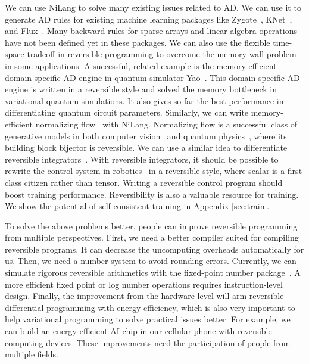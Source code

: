 \documentclass[aps,twocolumn,longbibliography,english,superscriptaddress]{revtex4-1}
\newcommand{\<}{\langle}
\renewcommand{\>}{\rangle}
\newcommand{\App}[1]{Appendix \ref{#1}}
\theoremstyle{definition}\newtheorem{definition}{\textit{Definition}}
\begin{document}
We can use NiLang to solve many existing issues related to AD.
We can use it to generate AD rules for existing machine learning packages like Zygote~\cite{Innes2019}, KNet~\cite{KNet}, and Flux~\cite{Innes2018a}.
Many backward rules for sparse arrays and linear algebra operations have not been defined yet in these packages.
We can also use the flexible time-space tradeoff in reversible programming to overcome the memory wall problem in some applications.
A successful, related example is the memory-efficient domain-specific AD engine in quantum simulator Yao~\cite{Luo2019}.
This domain-specific AD engine is written in a reversible style and solved the memory bottleneck in variational quantum simulations. It also gives so far the best performance in differentiating quantum circuit parameters.
Similarly, we can write memory-efficient normalizing flow~\cite{Kobyzev2019} with NiLang. Normalizing flow is a successful class of generative models in both computer vision~\cite{Kingma2018} and quantum physics~\cite{Dinh2016,Li2018}, where its building block bijector is reversible.
We can use a similar idea to differentiate reversible integrators~\cite{Hut1995, Laikov2018}.
With reversible integrators, it should be possible to rewrite the control system in robotics~\cite{Giftthaler2017} in a reversible style, where scalar is a first-class citizen rather than tensor.
Writing a reversible control program should boost training performance.
Reversibility is also a valuable resource for training.
We show the potential of self-consistent training in \App{sec:train}.

To solve the above problems better, people can improve reversible programming from multiple perspectives.
First, we need a better compiler suited for compiling reversible programs. It can decrease the uncomputing overheads automatically for us.
Then, we need a number system to avoid rounding errors. Currently, we can simulate rigorous reversible arithmetics with the fixed-point number package~\cite{FixedPointNumbers,LogarithmicNumbers}. A more efficient fixed point or log number operations requires instruction-level design.
Finally, the improvement from the hardware level will arm reversible differential programming with energy efficiency, which is also very important to help variational programming to solve practical issues better. For example, we can build an energy-efficient AI chip in our cellular phone with reversible computing devices.
These improvements need the participation of people from multiple fields.
\end{document}
